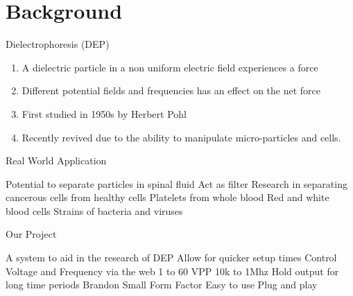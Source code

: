 
\subtitle{for Particle Separation in a Fluid}

\date{27 April 2016}




\begin{frame}
  \maketitle
\end{frame}

\section{Background}

\begin{frame}{Dielectrophoresis (DEP)}
  \begin{enumerate}
  \item A dielectric particle in a non uniform 
  electric field experiences a force
  \item Different potential fields and frequencies 
  has an effect on the net force
  \item First studied in 1950s by Herbert Pohl
  \item Recently revived due to the ability to
  manipulate micro-particles and cells. 
  \end{enumerate}
\end{frame}

\begin{frame}{Real World Application}
  \begin{enumerate}
    Potential to separate particles in spinal fluid
    Act as filter
    Research in separating cancerous cells from healthy cells
    Platelets from whole blood
    Red and white blood cells
    Strains of bacteria and viruses
  \end{enumerate}
\end{frame}

\begin{frame}{Our Project}
  \begin{enumerate}
    A system to aid in the research of DEP
    Allow for quicker setup times
    Control Voltage and Frequency via the web
     1 to 60 VPP
    10k to 1Mhz
    Hold output for long time periods
    Brandon
    Small Form Factor
    Easy to use
    Plug and play
  \end{enumerate}
\end{frame}

